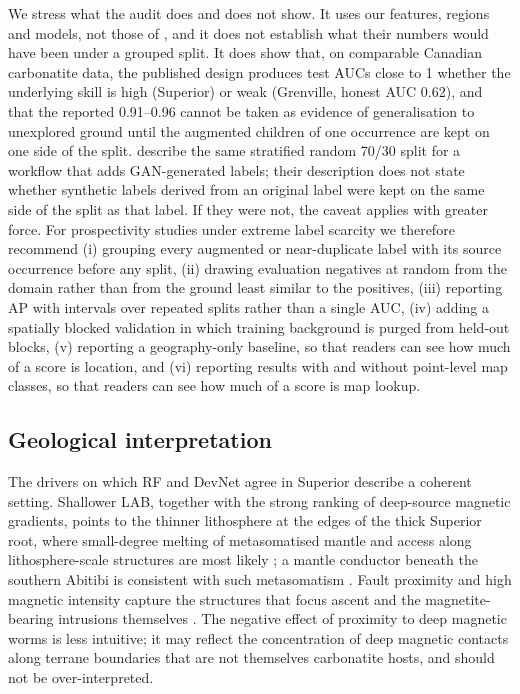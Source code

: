 \documentclass[pdflatex,sn-apa]{sn-jnl}
\begin{document}
We stress what the audit does and does not show. It uses our features, regions and models, not those of \citet{Parsa2024}, and it does not establish what their numbers would have been under a grouped split. It does show that, on comparable Canadian carbonatite data, the published design produces test AUCs close to 1 whether the underlying skill is high (Superior) or weak (Grenville, honest AUC 0.62), and that the reported 0.91--0.96 cannot be taken as evidence of generalisation to unexplored ground until the augmented children of one occurrence are kept on one side of the split. \citet{Parsa2025} describe the same stratified random 70/30 split for a workflow that adds GAN-generated labels; their description does not state whether synthetic labels derived from an original label were kept on the same side of the split as that label. If they were not, the caveat applies with greater force. For prospectivity studies under extreme label scarcity we therefore recommend (i) grouping every augmented or near-duplicate label with its source occurrence before any split, (ii) drawing evaluation negatives at random from the domain rather than from the ground least similar to the positives, (iii) reporting AP with intervals over repeated splits rather than a single AUC, (iv) adding a spatially blocked validation in which training background is purged from held-out blocks, (v) reporting a geography-only baseline, so that readers can see how much of a score is location, and (vi) reporting results with and without point-level map classes, so that readers can see how much of a score is map lookup.

\subsection{Geological interpretation}\label{sec:disc-geology}

The drivers on which RF and DevNet agree in Superior describe a coherent setting. Shallower LAB, together with the strong ranking of deep-source magnetic gradients, points to the thinner lithosphere at the edges of the thick Superior root, where small-degree melting of metasomatised mantle and access along lithosphere-scale structures are most likely \citep{Griffin2013,Groves2021,Hoggard2020}; a mantle conductor beneath the southern Abitibi is consistent with such metasomatism \citep{Snyder2021}. Fault proximity and high magnetic intensity capture the structures that focus ascent and the magnetite-bearing intrusions themselves \citep{Thomas2016}. The negative effect of proximity to deep magnetic worms is less intuitive; it may reflect the concentration of deep magnetic contacts along terrane boundaries that are not themselves carbonatite hosts, and should not be over-interpreted.
\end{document}
